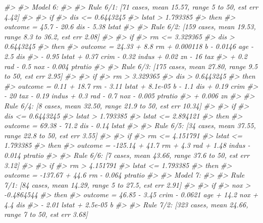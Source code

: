 \documentclass[]{book}
\newenvironment{Shaded}{\begin{snugshade}}{\end{snugshade}}
\newcommand{\CommentTok}[1]{\textcolor[rgb]{0.56,0.35,0.01}{\textit{#1}}}
\begin{document}
\begin{Shaded}
\begin{Highlighting}[]
\CommentTok{#> }
\CommentTok{#> Model 6:}
\CommentTok{#> }
\CommentTok{#>   Rule 6/1: [71 cases, mean 15.57, range 5 to 50, est err 4.42]}
\CommentTok{#> }
\CommentTok{#>     if}
\CommentTok{#>  dis <= 0.6443245}
\CommentTok{#>  lstat > 1.793385}
\CommentTok{#>     then}
\CommentTok{#>  outcome = 45.7 - 20.6 dis - 5.38 lstat}
\CommentTok{#> }
\CommentTok{#>   Rule 6/2: [159 cases, mean 19.53, range 8.3 to 36.2, est err 2.08]}
\CommentTok{#> }
\CommentTok{#>     if}
\CommentTok{#>  rm <= 3.329365}
\CommentTok{#>  dis > 0.6443245}
\CommentTok{#>     then}
\CommentTok{#>  outcome = 24.33 + 8.8 rm + 0.000118 b - 0.0146 age - 2.5 dis}
\CommentTok{#>            - 0.95 lstat + 0.37 crim - 0.32 indus + 0.02 zn - 16 tax}
\CommentTok{#>            + 0.2 rad - 0.5 nox - 0.004 ptratio}
\CommentTok{#> }
\CommentTok{#>   Rule 6/3: [175 cases, mean 27.80, range 9.5 to 50, est err 2.95]}
\CommentTok{#> }
\CommentTok{#>     if}
\CommentTok{#>  rm > 3.329365}
\CommentTok{#>  dis > 0.6443245}
\CommentTok{#>     then}
\CommentTok{#>  outcome = 0.11 + 18.7 rm - 3.11 lstat + 8.1e-05 b - 1.1 dis + 0.19 crim}
\CommentTok{#>            - 20 tax - 0.19 indus + 0.3 rad - 0.7 nox - 0.005 ptratio}
\CommentTok{#>            + 0.006 zn}
\CommentTok{#> }
\CommentTok{#>   Rule 6/4: [8 cases, mean 32.50, range 21.9 to 50, est err 10.34]}
\CommentTok{#> }
\CommentTok{#>     if}
\CommentTok{#>  dis <= 0.6443245}
\CommentTok{#>  lstat > 1.793385}
\CommentTok{#>  lstat <= 2.894121}
\CommentTok{#>     then}
\CommentTok{#>  outcome = 69.38 - 71.2 dis - 0.14 lstat}
\CommentTok{#> }
\CommentTok{#>   Rule 6/5: [34 cases, mean 37.55, range 22.8 to 50, est err 3.55]}
\CommentTok{#> }
\CommentTok{#>     if}
\CommentTok{#>  rm <= 4.151791}
\CommentTok{#>  lstat <= 1.793385}
\CommentTok{#>     then}
\CommentTok{#>  outcome = -125.14 + 41.7 rm + 4.3 rad + 1.48 indus - 0.014 ptratio}
\CommentTok{#> }
\CommentTok{#>   Rule 6/6: [7 cases, mean 43.66, range 37.6 to 50, est err 3.12]}
\CommentTok{#> }
\CommentTok{#>     if}
\CommentTok{#>  rm > 4.151791}
\CommentTok{#>  lstat <= 1.793385}
\CommentTok{#>     then}
\CommentTok{#>  outcome = -137.67 + 44.6 rm - 0.064 ptratio}
\CommentTok{#> }
\CommentTok{#> Model 7:}
\CommentTok{#> }
\CommentTok{#>   Rule 7/1: [84 cases, mean 14.29, range 5 to 27.5, est err 2.91]}
\CommentTok{#> }
\CommentTok{#>     if}
\CommentTok{#>  nox > -0.4864544}
\CommentTok{#>     then}
\CommentTok{#>  outcome = 46.85 - 3.45 crim - 0.0621 age + 14.2 nox + 4.4 dis}
\CommentTok{#>            - 2.01 lstat + 2.5e-05 b}
\CommentTok{#> }
\CommentTok{#>   Rule 7/2: [323 cases, mean 24.66, range 7 to 50, est err 3.68]}

\end{Highlighting}
\end{Shaded}
\end{document}
